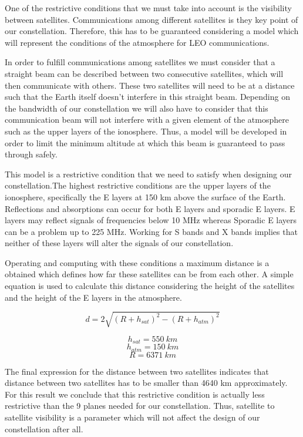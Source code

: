One of the restrictive conditions that we must take into account is the visibility between satellites. Communications among different satellites is they key point of our constellation. Therefore, this has to be guaranteed considering a model which will represent the conditions of the atmosphere for LEO communications.

In order to fulfill communications among satellites we must consider that a straight beam can be described between two consecutive satellites, which will then communicate with others. These two satellites will need to be at a distance such that the Earth itself doesn't interfere in this straight beam. Depending on the bandwidth of our constellation we will also have to consider that this communication beam will not interfere with a given element of the atmosphere such as the upper layers of the ionosphere. Thus, a model will be developed in order to limit the minimum altitude at which this beam is guaranteed to pass through safely.

This model is a restrictive condition that we need to satisfy when designing our constellation.The highest restrictive conditions are the upper layers of the ionosphere, specifically the E layers at 150 km above the surface of the Earth. Reflections and absorptions can occur for both E layers and sporadic E layers. E layers may reflect signals of frequencies below 10 MHz whereas Sporadic E layers can be a problem up to 225 MHz. Working for S bands and X bands implies that neither of these layers will alter the signals of our constellation.

Operating and computing with these conditions a maximum distance is a obtained which defines how far these satellites can be from each other. A simple equation is used to calculate this distance considering the height of the satellites and the height of the E layers in the atmosphere.

\[ d = 2 \sqrt{(R+h_{sat})^2 - (R+h_{atm})^2} \]

\[ h_{sat} = 550\ km\] 
\[ h_{atm} = 150\ km\]
\[R = 6371\ km\]

The final expression for the distance between two satellites indicates that distance between two satellites has to be smaller than 4640 km approximately. For this result we conclude that this restrictive condition is actually less restrictive than the 9 planes needed for our constellation. Thus, satellite to satellite visibility is a parameter which will not affect the design of our constellation after all. 